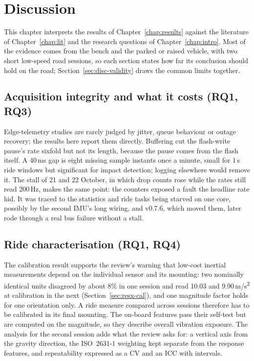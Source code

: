 \chapter{Discussion}
\label{chap:discussion}

This chapter interprets the results of Chapter~\ref{chap:results} against the literature of Chapter~\ref{chap:lit} and the research questions of Chapter~\ref{chap:intro}. Most of the evidence comes from the bench and the parked or raised vehicle, with two short low-speed road sessions, so each section states how far its conclusion should hold on the road; Section~\ref{sec:disc-validity} draws the common limits together.

\section{Acquisition integrity and what it costs (RQ1, RQ3)}
\label{sec:disc-acq}

Edge-telemetry studies are rarely judged by jitter, queue behaviour or outage recovery; the results here report them directly. Buffering cut the flash-write pause's rate sixfold but not its length, because the pause comes from the flash itself. A 40\,ms gap is eight missing sample instants once a minute, small for 1\,s ride windows but significant for impact detection; logging elsewhere would remove it. The stall of 21 and 22 October, in which drop counts rose while the rates still read 200\,Hz, makes the same point: the counters exposed a fault the headline rate hid. It was traced to the statistics and ride tasks being starved on one core, possibly by the second IMU's long wiring, and v0.7.6, which moved them, later rode through a real bus failure without a stall.

\section{Ride characterisation (RQ1, RQ4)}
\label{sec:disc-ride}

The calibration result supports the review's warning that low-cost inertial measurements depend on the individual sensor and its mounting: two nominally identical units disagreed by about 8\% in one session and read 10.03 and 9.90\,m/s\textsuperscript{2} at calibration in the next (Section~\ref{sec:resx-cal}), and one magnitude factor holds for one orientation only. A ride measure compared across sessions therefore has to be calibrated in its final mounting. The on-board features pass their self-test but are computed on the magnitude, so they describe overall vibration exposure. The analysis for the second session adds what the review asks for: a vertical axis from the gravity direction, the ISO~2631-1 weighting kept separate from the response features, and repeatability expressed as a CV and an ICC with intervals.

